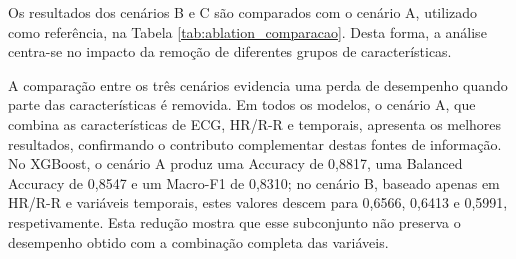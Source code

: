Os resultados dos cenários B e C são comparados com o cenário A, utilizado como referência, na Tabela \ref{tab:ablation_comparacao}. Desta forma, a análise centra-se no impacto da remoção de diferentes grupos de características.

\begin{table}[H]
\centering
\caption{Comparação do desempenho dos modelos nos três cenários do estudo de ablação, com avaliação LOSO.}
\label{tab:ablation_comparacao}
\end{table}

A comparação entre os três cenários evidencia uma perda de desempenho quando parte das características é removida. Em todos os modelos, o cenário A, que combina as características de ECG, HR/R-R e temporais, apresenta os melhores resultados, confirmando o contributo complementar destas fontes de informação. No XGBoost, o cenário A produz uma Accuracy de 0,8817, uma Balanced Accuracy de 0,8547 e um Macro-F1 de 0,8310; no cenário B, baseado apenas em HR/R-R e variáveis temporais, estes valores descem para 0,6566, 0,6413 e 0,5991, respetivamente. Esta redução mostra que esse subconjunto não preserva o desempenho obtido com a combinação completa das variáveis.

